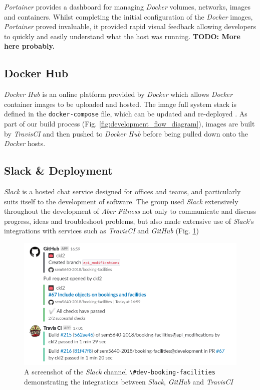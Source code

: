 \par
\textit{Portainer} provides a dashboard for managing \textit{Docker} volumes, networks, images and containers. Whilst completing the initial configuration of the \textit{Docker} images, \textit{Portainer} proved invaluable, it provided rapid visual feedback allowing developers to quickly and easily understand what the host was running. \textbf{TODO: More here probably.}

\subsection{Docker Hub}
\par
\textit{Docker Hub} is an online platform provided by \textit{Docker} which allows \textit{Docker} container images to be uploaded and hosted. The image full system stack is defined in the \lstinline{docker-compose} file, which can be updated and re-deployed . As part of our build process (Fig. \ref{fig:development_flow_diagram}), images are built by \textit{TravisCI} and then pushed to \textit{Docker Hub} before being pulled down onto the \textit{Docker} hosts.


\subsection{Slack \& Deployment}
\par
\textit{Slack} is a hosted chat service designed for offices and teams, and particularly suits itself to the development of software. The group used \textit{Slack} extensively throughout the development of \textit{Aber Fitness} not only to communicate and discuss progress, ideas and troubleshoot problems, but also made extensive use of \textit{Slack}'s integrations with services such as \textit{TravisCI} and \textit{GitHub} (Fig. \ref{fig:slack_travis_github})

\begin{figure}[H]
    \centering
    \includegraphics[width=\textwidth]{Images/Slack_Travis_GitHub.png}
    \caption{A screenshot of the \textit{Slack} channel \lstinline{\#dev-booking-facilities} demonstrating the integrations between \textit{Slack}, \textit{GitHub} and \textit{TravisCI}}
    \label{fig:slack_travis_github}
\end{figure}

